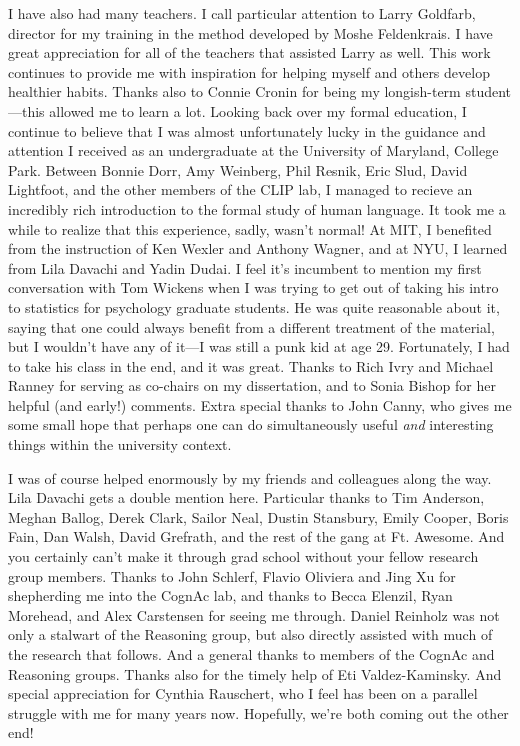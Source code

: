 \documentclass[12pt]{myucthesis}
\begin{document}
\begin{frontmatter}
\begin{acknowledgements}
I have also had many teachers. I call particular attention to Larry Goldfarb,
director for my training in the method developed by Moshe Feldenkrais. I have
great appreciation for all of the teachers that assisted Larry as well. This
work continues to provide me with inspiration for helping myself and others
develop healthier habits. Thanks also to Connie Cronin for being my longish-term
student---this allowed me to learn a lot. Looking back over my formal education,
I continue to believe that I was almost unfortunately lucky in the guidance and
attention I received as an undergraduate at the University of Maryland, College
Park. Between Bonnie Dorr, Amy Weinberg, Phil Resnik, Eric Slud, David
Lightfoot, and the other members of the CLIP lab, I managed to recieve an
incredibly rich introduction to the formal study of human language.  It took me
a while to realize that this experience, sadly, wasn't normal! At MIT, I
benefited from the instruction of Ken Wexler and Anthony Wagner, and at NYU, I
learned from Lila Davachi and Yadin Dudai.  I feel it's incumbent to mention my
first conversation with Tom Wickens when I was trying to get out of taking his
intro to statistics for psychology graduate students. He was quite reasonable
about it, saying that one could always benefit from a different treatment of the
material, but I wouldn't have any of it---I was still a punk kid at age 29.
Fortunately, I had to take his class in the end, and it was great. Thanks to
Rich Ivry and Michael Ranney for serving as co-chairs on my dissertation, and to
Sonia Bishop for her helpful (and early!) comments.  Extra special thanks to
John Canny, who gives me some small hope that perhaps one can do simultaneously
useful \emph{and} interesting things within the university context.

I was of course helped enormously by my friends and colleagues along the way.
Lila Davachi gets a double mention here. Particular thanks to Tim Anderson,
Meghan Ballog, Derek Clark, Sailor Neal, Dustin Stansbury, Emily Cooper, Boris
Fain, Dan Walsh, David Grefrath, and the rest of the gang at Ft. Awesome. And
you certainly can't make it through grad school without your fellow research
group members.  Thanks to John Schlerf, Flavio Oliviera and Jing Xu for
shepherding me into the CognAc lab, and thanks to Becca Elenzil, Ryan Morehead,
and Alex Carstensen for seeing me through. Daniel Reinholz was not only a
stalwart of the Reasoning group, but also directly assisted with much of the
research that follows. And a general thanks to members of the CognAc and
Reasoning groups. Thanks also for the timely help of Eti Valdez-Kaminsky. And
special appreciation for Cynthia Rauschert, who I feel has been on a parallel
struggle with me for many years now. Hopefully, we're both coming out the other
end!


\end{acknowledgements}
\end{frontmatter}
\end{document}
